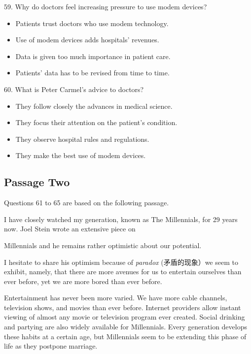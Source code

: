 \documentclass[UTF8,11pt]{ctexart}
\begin{document}
59. Why do doctors feel increasing pressure to use modem devices?


\begin{itemize}[leftmargin=2em,itemsep=.2em,topsep=.4em]\item[A.] Patients trust doctors who use modem technology.
\item[B.] Use of modem devices adds hospitals’ revenues.
\item[C.] Data is given too much importance in patient care.
\item[D.] Patients’ data has to be revised from time to time.
\end{itemize}

60. What is Peter Carmel’s advice to doctors?


\begin{itemize}[leftmargin=2em,itemsep=.2em,topsep=.4em]\item[A.] They follow closely the advances in medical science.
\item[B.] They focus their attention on the patient’s condition.
\item[C.] They observe hospital rules and regulations.
\item[D.] They make the best use of modem devices.
\end{itemize}

\subsection*{Passage Two}


Questions 61 to 65 are based on the following passage.


I have closely watched my generation, known as The Millennials, for 29 years now. Joel Stein wrote an extensive piece on


Millennials and he remains rather optimistic about our potential.


I hesitate to share his optimism because of\textit{ paradox} (矛盾的现象）we seem to exhibit, namely, that there are more avenues for us to entertain ourselves than ever before, yet we are more bored than ever before.


Entertainment has never been more varied. We have more cable channels, television shows, and movies than ever before. Internet providers allow instant viewing of almost any movie or television program ever created. Social drinking and partying are also widely available for Millennials. Every generation develops these habits at a certain age, but Millennials seem to be extending this phase of life as they postpone marriage.
\end{document}

